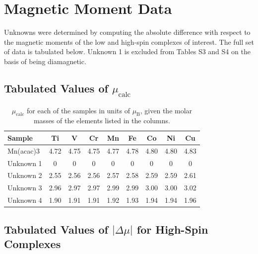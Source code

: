 \documentclass[journal = jacsat, manuscript = suppinfo]{achemso}
\begin{document}
\section{Magnetic Moment Data}

Unknowns were determined by computing the absolute difference with respect to
the magnetic moments of the low and high-spin complexes of interest. The full
set of data is tabulated below. Unknown 1 is excluded from Tables S3 and S4 on
the basis of being diamagnetic.

\subsection{Tabulated Values of $\mu_\text{calc}$}

\begin{table}[H]
\begin{tabular}{lcccccccc}
\toprule
Sample &        Ti &         V &        Cr &        Mn &        Fe &        Co &        Ni &        Cu \\
\midrule
Mn(acac)3 &  4.72 &  4.75 &  4.75 &  4.77 &  4.78 &  4.80 &  4.80 &  4.83 \\
Unknown 1 &  0    &  0    &  0    &  0    &  0    &  0    &  0    &  0    \\
Unknown 2 &  2.55 &  2.56 &  2.56 &  2.57 &  2.58 &  2.59 &  2.59 &  2.61 \\
Unknown 3 &  2.96 &  2.97 &  2.97 &  2.99 &  2.99 &  3.00 &  3.00 &  3.02 \\
Unknown 4 &  1.90 &  1.91 &  1.91 &  1.92 &  1.93 &  1.94 &  1.94 &  1.96 \\
\bottomrule
\end{tabular}
\caption{$\mu_\text{calc}$ for each of the samples in units of $\mu_\text{B}$, given the molar masses of
the elements listed in the columns.}
\end{table}

\subsection{Tabulated Values of $|\Delta\mu|$ for High-Spin Complexes}
\end{document}
